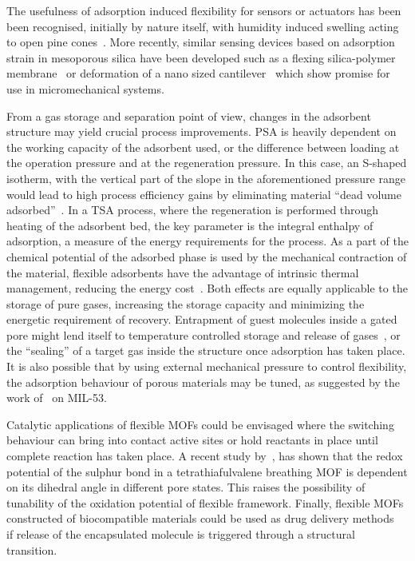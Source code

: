 The usefulness of adsorption induced flexibility for sensors or
actuators has been been recognised, initially by nature itself,
with humidity induced swelling acting to open pine 
cones~\cite{dawsonHowPineCones1997}.
More recently, similar sensing devices based on adsorption strain 
in mesoporous silica have been 
developed such as a flexing silica-polymer 
membrane~\cite{boudotConvertingWaterAdsorption2016} or 
deformation of a nano sized 
cantilever~\cite{ganserCantileverBendingBased2016} 
which show promise for use in micromechanical systems. 

From a gas storage and separation point of view, changes in the
adsorbent structure may yield crucial process improvements. 
\gls{PSA} is heavily
dependent on the working capacity of the adsorbent used, or the
difference between loading at the operation pressure and at the 
regeneration pressure. In this case, an S-shaped isotherm, with 
the vertical part of the slope in the aforementioned pressure 
range would lead to high process efficiency gains by eliminating material
``dead volume adsorbed''~\cite{schneemannFlexibleMetalOrganic2014}. 
In a \gls{TSA} process, where 
the regeneration is performed through heating of the adsorbent 
bed, the key parameter is the integral enthalpy of adsorption, a measure 
of the energy requirements for the process. As a part of the chemical 
potential of the adsorbed phase is used by the mechanical contraction
of the material, flexible adsorbents have the advantage of
intrinsic thermal management, reducing the energy 
cost~\cite{masonMethaneStorageFlexible2015}.
Both effects are equally applicable to the storage of pure 
gases, increasing the storage capacity and minimizing the energetic
requirement of recovery. Entrapment of guest molecules inside 
a gated pore might lend itself to temperature controlled storage and 
release of gases~\cite{bunzenAchievingLargeVolumetric2018}, or the
``sealing'' of a target gas inside the structure once adsorption
has taken place.
It is also possible that by using external mechanical pressure to
control flexibility, the adsorption behaviour of porous materials
may be tuned, as suggested by the work 
of~\citet{chanutUsingExternalFactors2016} on MIL-53. 

Catalytic applications of flexible \glspl{MOF} could be envisaged where 
the switching behaviour can bring into contact active sites or 
hold reactants in place until complete reaction has taken place.
A recent study by~\citet{soutoBreathingDependentRedoxActivity2018},
has shown that the redox potential of the sulphur bond in a 
tetrathiafulvalene breathing \gls{MOF} is dependent on its dihedral 
angle in different pore states. This raises the possibility of 
tunability of the oxidation potential of flexible framework.
Finally, flexible \glspl{MOF} constructed of biocompatible materials 
could be used as drug delivery 
methods~\cite{mckinlayNitricOxideAdsorption2013, %
horcajadaFlexiblePorousMetalOrganic2008} if release 
of the encapsulated molecule is triggered through a 
structural transition.


